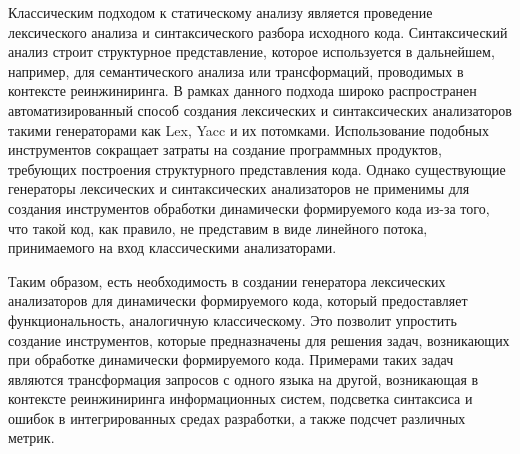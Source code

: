 \documentclass[10pt, conference, compsocconf]{IEEEtran}
\begin{document}
Классическим подходом к статическому анализу является проведение лексического анализа и синтаксического разбора исходного кода. Синтаксический анализ строит структурное представление, которое используется в дальнейшем, например, для семантического анализа или трансформаций, проводимых в контексте реинжиниринга. В рамках данного подхода широко распространен автоматизированный способ создания лексических и синтаксических анализаторов такими генераторами как Lex, Yacc и их потомками. Использование подобных инструментов сокращает затраты на создание программных продуктов, требующих построения структурного представления кода. Однако существующие генераторы лексических и синтаксических анализаторов не применимы для создания инструментов обработки динамически формируемого кода из-за того, что такой код, как правило, не представим в виде линейного потока, принимаемого на вход классическими анализаторами. 
% 

Таким образом, есть необходимость в создании генератора лексических анализаторов для динамически формируемого кода, который предоставляет функциональность, аналогичную классическому. Это позволит упростить создание инструментов, которые предназначены для решения задач, возникающих при обработке динамически формируемого кода. Примерами таких задач являются трансформация запросов с одного языка на другой, возникающая в контексте реинжиниринга информационных систем, подсветка синтаксиса и ошибок в интегрированных средах разработки, а также подсчет различных метрик.  
 
\end{document}
